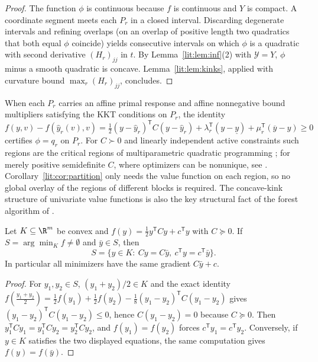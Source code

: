 \begin{proof}
The function $\phi$ is continuous because $f$ is continuous and $Y$ is compact. A
coordinate segment meets each $P_r$ in a closed interval. Discarding degenerate intervals and
refining overlaps (on an overlap of positive length two quadratics that both equal $\phi$ coincide)
yields consecutive intervals on which $\phi$ is a quadratic with second derivative
$(H_r)_{jj}$ in $t$. By Lemma~\ref{lit:lem:inf}(2) with $\mathcal Y=Y$, $\phi$ minus a
smooth quadratic is concave. Lemma~\ref{lit:lem:kinks}, applied with curvature bound $\max_r(H_r)_{jj}$, concludes.
\end{proof}

\begin{remark}
When each $P_r$ carries an affine primal response and affine nonnegative bound multipliers
satisfying the KKT conditions on $P_r$, the identity
$f(y,v)-f(\hat y_r(v),v)=\tfrac12(y-\hat y_r)^{\mathsf T}C(y-\hat y_r)+\lambda_r^{\mathsf T}(y-\underline y)
+\mu_r^{\mathsf T}(\overline y-y)\ge0$ certifies $\phi=q_r$ on $P_r$. For $C\succ0$ and linearly independent
active constraints such regions are the critical regions of multiparametric quadratic
programming \cite[Theorems~2 and~4]{BemporadEtAl2002}; for merely positive semidefinite $C$, where
optimizers can be nonunique, see \cite{SpjotvoldTondelJohansen2005,SpjotvoldTondelJohansen2007,
PatrinosSarimveis2011}. Corollary~\ref{lit:cor:partition} only needs the value function on each
region, so no global overlay of the regions of different blocks is required. The concave-kink
structure of univariate value functions is also the key structural fact of the forest algorithm
of \cite{DelPiaKhajavirad2026}.
\end{remark}

\begin{lemma}\label{lit:lem:mangasarian}
Let $K\subseteq\R^m$ be convex and $f(y)=\tfrac12y^{\mathsf T}Cy+c^{\mathsf T}y$ with $C\succeq0$.
If $S=\arg\min_Kf\neq\emptyset$ and $\bar y\in S$, then
\[
S=\{y\in K:\ Cy=C\bar y,\ c^{\mathsf T}y=c^{\mathsf T}\bar y\}.
\]
In particular all minimizers have the same gradient $C\bar y+c$.
\end{lemma}

\begin{proof}
For $y_1,y_2\in S$, $(y_1+y_2)/2\in K$ and the exact identity
$f(\tfrac{y_1+y_2}2)=\tfrac12f(y_1)+\tfrac12f(y_2)-\tfrac18(y_1-y_2)^{\mathsf T}C(y_1-y_2)$ gives
$(y_1-y_2)^{\mathsf T}C(y_1-y_2)\le0$, hence $C(y_1-y_2)=0$ because $C\succeq0$. Then
$y_1^{\mathsf T}Cy_1=y_1^{\mathsf T}Cy_2=y_2^{\mathsf T}Cy_2$, and $f(y_1)=f(y_2)$ forces
$c^{\mathsf T}y_1=c^{\mathsf T}y_2$. Conversely, if $y\in K$ satisfies the two displayed equations,
the same computation gives $f(y)=f(\bar y)$.
\end{proof}

